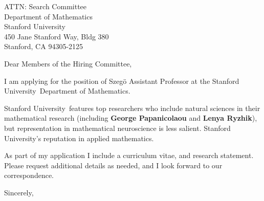 \documentclass[11pt,a4paper]{letter}
\begin{document}

\def\School{Stanford University}

\begin{letter}
{ATTN: Search Committee\\
Department of Mathematics\\
Stanford University\\
450 Jane Stanford Way, Bldg 380\\
Stanford, CA 94305-2125}


\opening{Dear Members of the Hiring Committee,}

I am applying for the position of Szeg\"{o} Assistant Professor at the \School~Department of Mathematics. 



\School~features top researchers who include natural sciences in their mathematical research (including \textbf{George Papanicolaou} and \textbf{Lenya Ryzhik}), but representation in mathematical neuroscience is less salient. \School's reputation in applied mathematics.



As part of my application I include a curriculum vitae, and research statement. Please request additional details as needed, and I look forward to our correspondence.

\closing{Sincerely,}
\end{letter}
\end{document}
